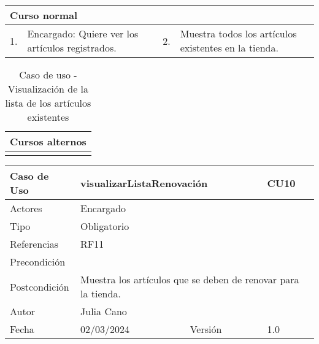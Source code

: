 \begin{table}[H]
	\centering
	\begin{tabular}{| m{} | m{} | m{} | m{} |}
		\hline
		\multicolumn{4}{|m{0.9\textwidth}|}{Curso normal}     \\ 
		\hline
		1. & Encargado: Quiere ver los artículos registrados. & 2. &  Muestra todos los artículos existentes en la tienda.  \\ 
		\hline
	\end{tabular}
\end{table}

\begin{table}[H]
	\centering
	\begin{tabular}{| m{} | m{} | m{} | m{} |}
		\hline
		\multicolumn{4}{|m{0.9\textwidth}|}{Cursos alternos}     \\ 
		\hline
		& \multicolumn{3}{m{0.67\textwidth}|}{} \\ 
		\hline
	\end{tabular}
	\caption{Caso de uso - Visualización de la lista de los artículos existentes}
\end{table}

\newpage



\begin{table}[H]
	\centering
	\begin{tabular}{| m{} | m{} | m{} | m{}|}
		\hline
		\rowcolor{grayshade} Caso de Uso & \multicolumn{2}{|m{0.43\textwidth}|}{visualizarListaRenovación} &  CU10\\ 
		\hline
		Actores & \multicolumn{3}{l|}{Encargado} \\ 
		\hline
		Tipo & \multicolumn{3}{l|}{Obligatorio} \\ 
		\hline
		Referencias & \multicolumn{3}{l|}{RF11} \\ 
		\hline
		Precondición & \multicolumn{3}{m{0.67\textwidth}|}{} \\ 
		\hline
		Postcondición & \multicolumn{3}{m{0.67\textwidth}|}{Muestra los artículos que se deben de renovar para la tienda.} \\ 
		\hline
		Autor & \multicolumn{3}{l|}{Julia Cano} \\ 
		\hline
		Fecha & 02/03/2024 & Versión & 1.0 \\
		\hline
	\end{tabular}
\end{table}

